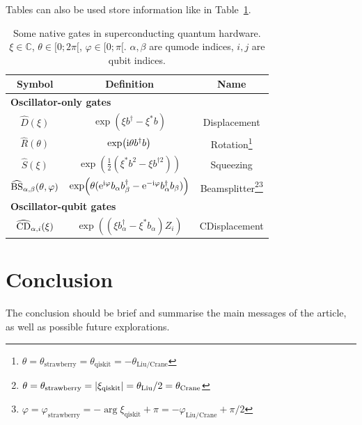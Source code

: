 \documentclass[
 reprint,
 preprintnumbers,
 nobibnotes,
 nofootinbib,
 longbibliography,
 amsmath,amssymb,
 aps,pra
]{revtex4-2}
\begin{document}

Tables can also be used store information like in Table~\ref{tab:gates}.

\begin{table}[ht]
\begin{ruledtabular}
    \centering
    \begin{tabular}{ccc}
        Symbol & Definition & Name \\ \hline
        \multicolumn{3}{l}{\bf Oscillator-only gates} \\ \hline
        $\hat{D} (\xi)$ & $\exp( \xi  b^\dag - \xi^\ast b )$ & Displacement \\
        $\hat{R} (\theta)$ & $\exp( {\rm i} \theta  b^\dag b )$ & Rotation\footnote{$\theta = \theta_\text{strawberry} = \theta_\text{qiskit} = -\theta_\text{Liu/Crane}$} \\
        $\hat{S} (\xi)$ & $\exp( \frac{1}{2} (\xi^\ast  b^2 - \xi b^{\dag2}) )$ & Squeezing \\
        $\widehat{\rm BS}_{\alpha,\beta} (\theta,\varphi)$ & $\exp( \theta ( {\rm e}^{{\rm i}\varphi} b_\alpha b_\beta^\dag - {\rm e}^{-{\rm i}\varphi} b_\alpha^\dag b_\beta) )$ & Beamsplitter\footnote{$\theta = \theta_\text{strawberry} = \abs{\xi_\text{qiskit}} = \theta_\text{Liu}/2 = \theta_\text{Crane}$}\footnote{$\varphi = \varphi_\text{strawberry} = - \arg{\xi_\text{qiskit}} + \pi = - \varphi_\text{Liu/Crane} + \pi/2$} \\ \hline
        \multicolumn{3}{l}{{\bf Oscillator-qubit gates}} \\ \hline
        $\widehat{\rm CD}_{\alpha,i} (\xi)$ & $\exp( (\xi  b_\alpha^\dag - \xi^\ast b_\alpha) Z_i )$ & CDisplacement
    \end{tabular}
    \caption{Some native gates in superconducting quantum hardware. $\xi\in\mathbb{C}$, $\theta\in [0;2\pi[$, $\varphi\in[0;\pi[$. $\alpha,\beta$ are qumode indices, $i,j$ are qubit indices.}
    \label{tab:gates}
\end{ruledtabular}
\end{table}


\section*{Conclusion}

The conclusion should be brief and summarise the main messages of the article, as well as possible future explorations.
\end{document}
